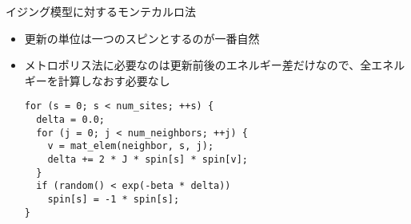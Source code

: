 
\begin{frame}[t,fragile]{イジング模型に対するモンテカルロ法}
  \begin{itemize}
  \item 更新の単位は一つのスピンとするのが一番自然
  \item メトロポリス法に必要なのは更新前後のエネルギー差だけなので、全エネルギーを計算しなおす必要なし
\begin{verbatim}
for (s = 0; s < num_sites; ++s) {
  delta = 0.0;
  for (j = 0; j < num_neighbors; ++j) {
    v = mat_elem(neighbor, s, j);
    delta += 2 * J * spin[s] * spin[v];
  }
  if (random() < exp(-beta * delta))
    spin[s] = -1 * spin[s];
}  
\end{verbatim}
  \end{itemize}
\end{frame}
